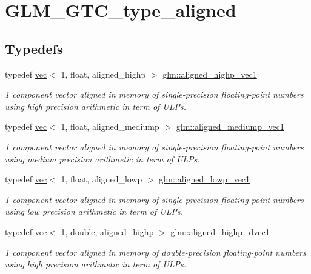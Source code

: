\hypertarget{group__gtc__type__aligned}{}\section{G\+L\+M\+\_\+\+G\+T\+C\+\_\+type\+\_\+aligned}
\label{group__gtc__type__aligned}
\subsection*{Typedefs}
\begin{DoxyCompactItemize}
\item 
typedef \hyperlink{structglm_1_1vec}{vec}$<$ 1, float, aligned\+\_\+highp $>$ \hyperlink{group__gtc__type__aligned_ga8da7535c1fe488b2b9a29c0c05e7b17e}{glm\+::aligned\+\_\+highp\+\_\+vec1}
\begin{DoxyCompactList}\small\item\em 1 component vector aligned in memory of single-\/precision floating-\/point numbers using high precision arithmetic in term of U\+L\+Ps. \end{DoxyCompactList}\item 
typedef \hyperlink{structglm_1_1vec}{vec}$<$ 1, float, aligned\+\_\+mediump $>$ \hyperlink{group__gtc__type__aligned_ga8751a96bb361e9f007e5555eb90e3230}{glm\+::aligned\+\_\+mediump\+\_\+vec1}
\begin{DoxyCompactList}\small\item\em 1 component vector aligned in memory of single-\/precision floating-\/point numbers using medium precision arithmetic in term of U\+L\+Ps. \end{DoxyCompactList}\item 
typedef \hyperlink{structglm_1_1vec}{vec}$<$ 1, float, aligned\+\_\+lowp $>$ \hyperlink{group__gtc__type__aligned_ga9a7ee43ec4c9d0c59740b96c10aee479}{glm\+::aligned\+\_\+lowp\+\_\+vec1}
\begin{DoxyCompactList}\small\item\em 1 component vector aligned in memory of single-\/precision floating-\/point numbers using low precision arithmetic in term of U\+L\+Ps. \end{DoxyCompactList}\item 
typedef \hyperlink{structglm_1_1vec}{vec}$<$ 1, double, aligned\+\_\+highp $>$ \hyperlink{group__gtc__type__aligned_ga85671dcb7eef983b5035273fe78dd963}{glm\+::aligned\+\_\+highp\+\_\+dvec1}
\begin{DoxyCompactList}\small\item\em 1 component vector aligned in memory of double-\/precision floating-\/point numbers using high precision arithmetic in term of U\+L\+Ps. \end{DoxyCompactList}\item 

\end{DoxyCompactItemize}
